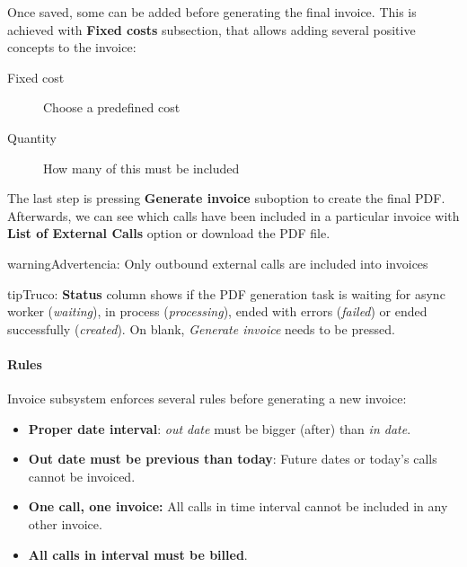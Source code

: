 \documentclass[letterpaper,10pt,spanish]{sphinxmanual}
\begin{document}
Once saved, some {\hyperref[administration_portal/brand/invoicing/invoice_schedulers:fixed\string-costs]{}} can be added before generating the final invoice. This is achieved with \textbf{Fixed costs}
subsection, that allows adding several positive concepts to the invoice:
\begin{description}
\item[{Fixed cost}] \leavevmode{}\label{administration_portal/brand/invoicing/invoices:term-fixed-cost}
Choose a predefined cost

\item[{Quantity}] \leavevmode{}\label{administration_portal/brand/invoicing/invoices:term-quantity}
How many of this must be included

\end{description}

The last step is pressing \textbf{Generate invoice} suboption to create the final PDF. Afterwards, we can see which calls have been
included in a particular invoice with \textbf{List of External Calls} option or download the PDF file.

\begin{notice}{warning}{Advertencia:}
Only outbound external calls are included into invoices
\end{notice}

\begin{notice}{tip}{Truco:}
\textbf{Status} column shows if the PDF generation task is waiting for async worker (\emph{waiting}), in process (\emph{processing}),
ended with errors (\emph{failed}) or ended successfully (\emph{created}). On blank, \emph{Generate invoice} needs to be pressed.
\end{notice}


\paragraph{Rules}
\label{administration_portal/brand/invoicing/invoices:rules}
Invoice subsystem enforces several rules before generating a new invoice:
\begin{itemize}
\item {} 
\textbf{Proper date interval}: \emph{out date} must be bigger (after) than \emph{in date}.

\item {} 
\textbf{Out date must be previous than today}: Future dates or today's calls cannot be invoiced.

\item {} 
\textbf{One call, one invoice:} All calls in time interval cannot be included in any other invoice.

\item {} 
\textbf{All calls in interval must be billed}.

\end{itemize}
\end{document}
